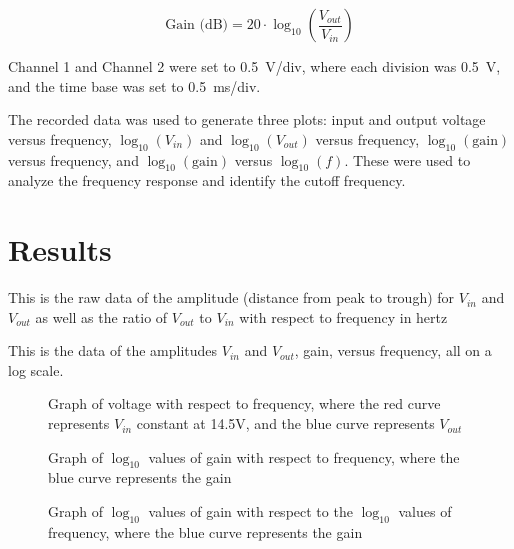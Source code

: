 \documentclass[10pt,journal,twoside]{IEEEtran} %
\begin{document}
\begin{equation}
    \text{Gain (dB)} = 20 \cdot \log_{10}\left(\frac{V_{out}}{V_{in}}\right)
\end{equation}

Channel 1 and Channel 2 were set to \SI{0.5}{\volt}/div, where each division was \SI{0.5}{\volt}, and the time base was set to \SI{0.5}{\milli\second}/div.

The recorded data was used to generate three plots: input and output voltage versus frequency, $\log_{10}(V_{in})$ and $\log_{10}(V_{out})$ versus frequency, $\log_{10}(\text{gain})$ versus frequency, and $\log_{10}(\text{gain})$ versus $\log_{10}(f)$. These were used to analyze the frequency response and identify the cutoff frequency.

\section{Results}


This is the raw data of the amplitude (distance from peak to trough) for $V_{in}$ and $V_{out}$ as well as the ratio of $V_{out}$ to $V_{in}$ with respect to frequency in hertz


This is the data of the amplitudes $V_{in}$ and $V_{out}$, gain, versus frequency, all on a log scale.


\begin{figure}
\begin{center}

\end{center}
\caption{Graph of voltage with respect to frequency, where the red curve represents $V_{in}$ constant at 14.5V, and the blue curve represents $V_{out}$}
\label{fig:results}
\end{figure}


\begin{figure}
\begin{center}

\end{center}
\caption{Graph of $\log_{10}$ values of gain with respect to frequency, where the blue curve represents the gain}
\label{fig:flaw}
\end{figure} 


\begin{figure}
\begin{center}

\end{center}
\caption{Graph of $\log_{10}$ values of gain with respect to the $\log_{10}$ values of frequency, where the blue curve represents the gain}
\label{fig: voltage difference}
\end{figure} 
\end{document}
